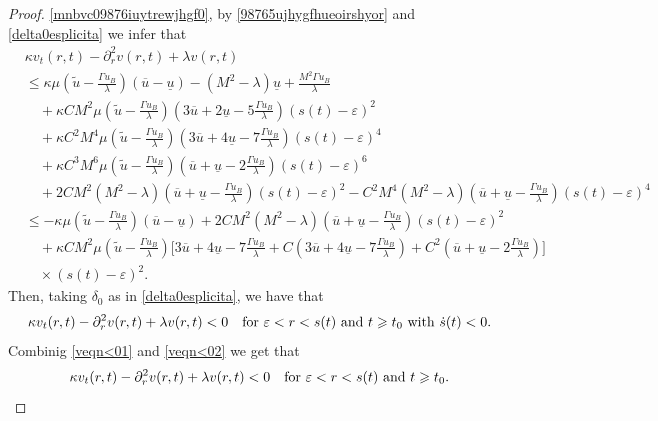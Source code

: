 \documentclass[12pt,a4paper,intlimits,sumlimits]{amsart}
\theoremstyle{definition}
\theoremstyle{plain}
\numberwithin{equation}{section}
\renewcommand{\leq}{\leqslant}
\renewcommand{\ge}{\geqslant}
\begin{document}
\begin{proof}
\eqref{mnbvc09876iuytrewjhgf0}, by \eqref{98765ujhygfhueoirshyor} and \eqref{delta0esplicita} we infer that
\[
\begin{aligned}
&\kappa v_t(r, t)- \partial^2_r v(r, t) +\lambda v(r, t) \\
&\leq \kappa \mu \left(\widetilde u-\frac{\Gamma u_B}{\lambda} \right)(\overline u-\underline u)-(M^2-\lambda)\underline{u}+\frac{M^2\Gamma u_B}{\lambda}\\
&\quad+\kappa CM^2\mu\left(\widetilde u-\frac{\Gamma u_B}{\lambda} \right)\left(3\overline u+2\underline u-5\frac{\Gamma u_B}{\lambda} \right)(s(t)-\varepsilon)^2 \\
&\quad +\kappa C^2M^4\mu\left(\widetilde u-\frac{\Gamma u_B}{\lambda} \right)\left(3\overline u+4\underline u-7\frac{\Gamma u_B}{\lambda} \right)(s(t)-\varepsilon)^4 \\
&\quad
+\kappa C^3M^6\mu\left(\widetilde u-\frac{\Gamma u_B}{\lambda} \right)\left(\overline u+\underline u-2\frac{\Gamma u_B}{\lambda} \right)(s(t)-\varepsilon)^6 \\
&\quad +2CM^2(M^2-\lambda)\left(\overline u+\underline u-\frac{\Gamma u_B}{\lambda} \right)(s(t)-\varepsilon)^2
-C^2M^4(M^2-\lambda)\left(\overline u+\underline u-\frac{\Gamma u_B}{\lambda} \right)(s(t)-\varepsilon)^4 \\
&\leq -\kappa \mu \left(\widetilde u-\frac{\Gamma u_B}{\lambda} \right)(\overline u-\underline u)+2CM^2(M^2-\lambda)\left(\overline u+\underline u-\frac{\Gamma u_B}{\lambda} \right)(s(t)-\varepsilon)^2\\
&\quad +\kappa CM^2 \mu\left(\widetilde u-\frac{\Gamma u_B}{\lambda} \right)\Bigg[3\overline u+4\underline u-7\frac{\Gamma u_B}{\lambda} +C\left(3\overline u+4\underline u-7\frac{\Gamma u_B}{\lambda} \right)+C^2\left(\overline u+\underline u-2\frac{\Gamma u_B}{\lambda} \right) \Bigg]\\
&\quad \times (s(t)-\varepsilon)^2.
\end{aligned}
\]
Then, taking $\delta_0$ as in \eqref{delta0esplicita}, we have that
\begin{equation}\label{veqn<02}
\kappa v_t(r, t)- \partial^2_r v(r, t) +\lambda v(r, t) <0
\quad \mbox{for~$ \varepsilon<r<s(t)$ and~$t\ge t_0$ with }\dot s(t)< 0.
\end{equation}
Combinig \eqref{veqn<01} and \eqref{veqn<02} we get that
\begin{equation}\label{veqn<0}
\kappa v_t(r, t)- \partial^2_r v(r, t) +\lambda v(r, t) <0
\quad \mbox{for~$ \varepsilon<r<s(t)$ and~$t\ge t_0$}.
\end{equation}


\end{proof}
\end{document}
